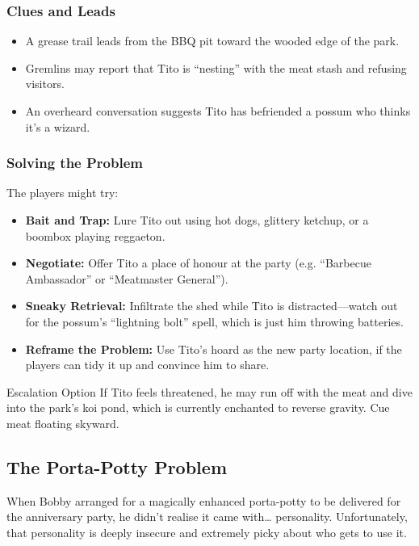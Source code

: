 \subsubsection{Clues and Leads}
\begin{itemize}
    \item A grease trail leads from the BBQ pit toward the wooded edge of the park.
    \item Gremlins may report that Tito is “nesting” with the meat stash and refusing visitors.
    \item An overheard conversation suggests Tito has befriended a possum who thinks it’s a wizard.
\end{itemize}

\subsubsection{Solving the Problem}
The players might try:
\begin{itemize}
    \item \textbf{Bait and Trap:} Lure Tito out using hot dogs, glittery ketchup, or a boombox playing reggaeton.
    \item \textbf{Negotiate:} Offer Tito a place of honour at the party (e.g. “Barbecue Ambassador” or “Meatmaster General”).
    \item \textbf{Sneaky Retrieval:} Infiltrate the shed while Tito is distracted—watch out for the possum’s “lightning bolt” spell, which is just him throwing batteries.
    \item \textbf{Reframe the Problem:} Use Tito’s hoard as the new party location, if the players can tidy it up and convince him to share.
\end{itemize}

\begin{CommentBox}{Escalation Option}
    If Tito feels threatened, he may run off with the meat and dive into the park’s koi pond, which is currently enchanted to reverse gravity. Cue meat floating skyward.
\end{CommentBox}


\subsection{The Porta-Potty Problem}

When Bobby arranged for a magically enhanced porta-potty to be delivered for the anniversary party, he didn’t realise it came with… personality. Unfortunately, that personality is deeply insecure and extremely picky about who gets to use it.

